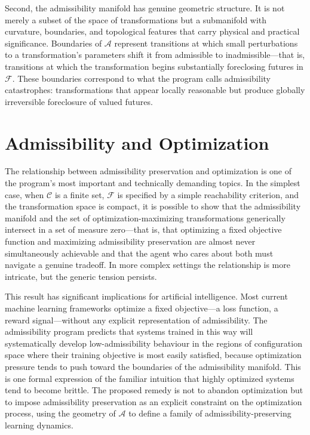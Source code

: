 \documentclass[11pt, oneside]{book}
\theoremstyle{definition}
\theoremstyle{remark}
\begin{document}
Second, the admissibility manifold has genuine geometric structure. It is not merely a subset of the space of transformations but a submanifold with curvature, boundaries, and topological features that carry physical and practical significance. Boundaries of $\mathcal{A}$ represent transitions at which small perturbations to a transformation's parameters shift it from admissible to inadmissible—that is, transitions at which the transformation begins substantially foreclosing futures in $\mathcal{F}$. These boundaries correspond to what the program calls admissibility catastrophes: transformations that appear locally reasonable but produce globally irreversible foreclosure of valued futures.

\section{Admissibility and Optimization}

The relationship between admissibility preservation and optimization is one of the program's most important and technically demanding topics. In the simplest case, when $\mathcal{C}$ is a finite set, $\mathcal{F}$ is specified by a simple reachability criterion, and the transformation space is compact, it is possible to show that the admissibility manifold and the set of optimization-maximizing transformations generically intersect in a set of measure zero—that is, that optimizing a fixed objective function and maximizing admissibility preservation are almost never simultaneously achievable and that the agent who cares about both must navigate a genuine tradeoff. In more complex settings the relationship is more intricate, but the generic tension persists.

This result has significant implications for artificial intelligence. Most current machine learning frameworks optimize a fixed objective—a loss function, a reward signal—without any explicit representation of admissibility. The admissibility program predicts that systems trained in this way will systematically develop low-admissibility behaviour in the regions of configuration space where their training objective is most easily satisfied, because optimization pressure tends to push toward the boundaries of the admissibility manifold. This is one formal expression of the familiar intuition that highly optimized systems tend to become brittle. The proposed remedy is not to abandon optimization but to impose admissibility preservation as an explicit constraint on the optimization process, using the geometry of $\mathcal{A}$ to define a family of admissibility-preserving learning dynamics.
\end{document}
